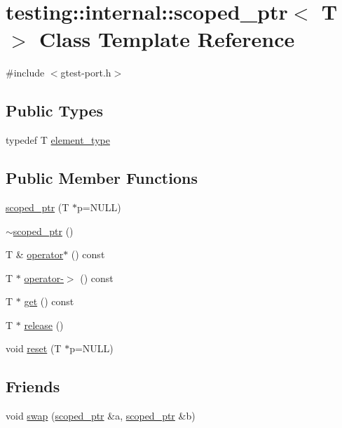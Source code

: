 \hypertarget{classtesting_1_1internal_1_1scoped__ptr}{}\section{testing\+:\+:internal\+:\+:scoped\+\_\+ptr$<$ T $>$ Class Template Reference}
\label{classtesting_1_1internal_1_1scoped__ptr}


{\ttfamily \#include $<$gtest-\/port.\+h$>$}

\subsection*{Public Types}
\begin{DoxyCompactItemize}
\item 
typedef T \hyperlink{classtesting_1_1internal_1_1scoped__ptr_ae755ffeebada8e20b68c1d1ffa91cf13}{element\+\_\+type}
\end{DoxyCompactItemize}
\subsection*{Public Member Functions}
\begin{DoxyCompactItemize}
\item 
\hyperlink{classtesting_1_1internal_1_1scoped__ptr_adb972432999a0c63720df148964ac2a5}{scoped\+\_\+ptr} (T $\ast$p=N\+U\+LL)
\item 
\hyperlink{classtesting_1_1internal_1_1scoped__ptr_ab721de9bf4369f002fb563e82352ee36}{$\sim$scoped\+\_\+ptr} ()
\item 
T \& \hyperlink{classtesting_1_1internal_1_1scoped__ptr_ab197837f87062de69d9d6e04539bbabe}{operator$\ast$} () const 
\item 
T $\ast$ \hyperlink{classtesting_1_1internal_1_1scoped__ptr_adc38310fbbe400faf9279e36000a17c4}{operator-\/$>$} () const 
\item 
T $\ast$ \hyperlink{classtesting_1_1internal_1_1scoped__ptr_adc8f8fcb63ce69f80f011456e6d2f08d}{get} () const 
\item 
T $\ast$ \hyperlink{classtesting_1_1internal_1_1scoped__ptr_a7a4f3e568d81a5d8bcb5f8d6bf5130b1}{release} ()
\item 
void \hyperlink{classtesting_1_1internal_1_1scoped__ptr_acac03266a43359801aff0de5c990bec0}{reset} (T $\ast$p=N\+U\+LL)
\end{DoxyCompactItemize}
\subsection*{Friends}
\begin{DoxyCompactItemize}
\item 
void \hyperlink{classtesting_1_1internal_1_1scoped__ptr_a01bc0441e6a3ebf26807ac523392ca86}{swap} (\hyperlink{classtesting_1_1internal_1_1scoped__ptr}{scoped\+\_\+ptr} \&a, \hyperlink{classtesting_1_1internal_1_1scoped__ptr}{scoped\+\_\+ptr} \&b)
\end{DoxyCompactItemize}


